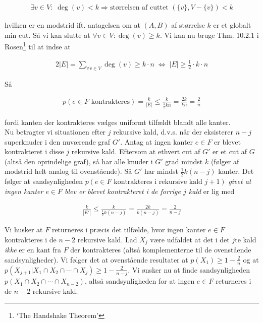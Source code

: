\documentclass[12pt]{article}
\begin{document}
\begin{align*}
    \exists v \in V: \; \deg(v) < k \Rightarrow \text{størrelsen af cuttet } (\{v\},V-\{v\})<k 
\end{align*}

hvilken er en modstrid ift. antagelsen om at $(A,B)$ af størrelse $k$ er et globalt min cut. Så vi kan slutte at $\forall v \in V: \deg(v) \ge k$. Vi kan nu bruge Thm. 10.2.1 i Rosen\footnote{`The Handshake Theorem'} til at indse at 

\begin{align*}
    2|E| = \sum_{\forall v \in V} \deg(v) \ge k \cdot n \; \Leftrightarrow \; |E| \ge \frac{1}{2} \cdot k \cdot n
\end{align*}

Så 

\begin{align*}
    p(e \in F \text{ kontrakteres}) = \frac{k}{|E|} \le \frac{k}{\frac{1}{2}kn} = \frac{2k}{kn} = \frac{2}{n}
\end{align*}

fordi kanten der kontrakteres vælges uniformt tilfældt blandt alle kanter. \\

Nu betragter vi situationen efter $j$ rekursive kald, d.v.s. når der eksisterer $n-j$ superknuder i den nuværende graf $G'$. Antag at ingen kanter $e \in F$ er blevet kontrakteret i disse $j$ rekursive kald. Eftersom at ethvert cut af $G'$ er et cut af $G$ (altså den oprindelige graf), så har alle knuder i $G'$ grad mindst $k$ (følger af modstrid helt analog til ovenstående). Så $G'$ har mindst $\frac{1}{2}k(n-j)$ kanter. Det følger at sandsynligheden $p(e \in F \text{ kontrakteres i rekursive kald } j+1)$ \textit{givet at ingen kanter $e\in F$ blev er blevet kontrakteret i de forrige $j$ kald} er lig med 

\begin{align*}
   \frac{k}{|E'|} \le \frac{k}{\frac{1}{2} k(n-j)} = \frac{2k}{k(n-j)} = \frac{2}{n-j}
\end{align*}

Vi husker at $F$ returneres i præcis det tilfælde, hvor ingen kanter $e \in F$ kontrakteres i de $n-2$ rekursive kald. Lad $X_j$ være udfaldet at det i det $j$te kald \textit{ikke} er en kant fra $F$ der kontrakteres (altså komplementerne til de ovenstående sandsynligheder). Vi følger det at ovenstående resultater at $p(X_1) \ge 1 - \frac{2}{n}$ og at $p(X_{j+1}|X_1 \cap X_2 \cap \cdots \cap X_{j}) \ge 1- \frac{2}{n-j}$. Vi ønsker nu at finde sandsynligheden $p(X_1 \cap X_2 \cap \cdots \cap X_{n-2})$, altså sandsynligheden for at ingen $e \in F$ returneres i de $n-2$ rekursive kald.
\end{document}

